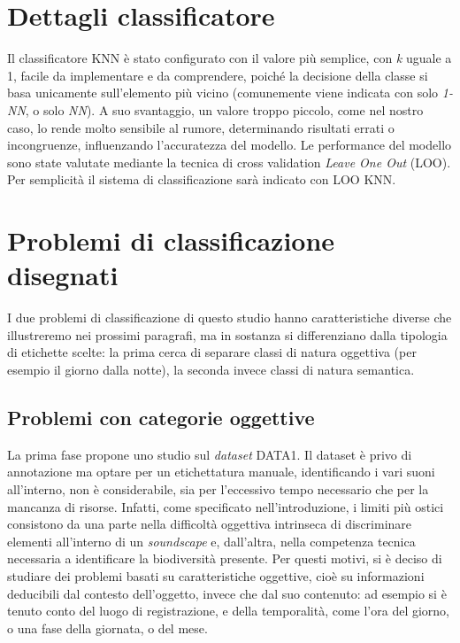\section{Dettagli classificatore}
Il classificatore KNN è stato configurato con il valore più semplice, con \textit{k} uguale a 1, facile da
implementare e da comprendere, poiché la decisione della classe si basa unicamente
sull’elemento più vicino (comunemente viene indicata con solo \textit{1-NN}, o solo \textit{NN}). A suo
svantaggio, un valore troppo piccolo, come nel nostro caso, lo rende molto sensibile al
rumore, determinando risultati errati o incongruenze, influenzando l’accuratezza del modello.
Le performance del modello sono state valutate mediante la tecnica di cross validation \textit{Leave
One Out} (LOO). Per semplicità il sistema di classificazione sarà indicato con LOO KNN.

\section{Problemi di classificazione disegnati}
I due problemi di classificazione di questo studio hanno caratteristiche diverse che
illustreremo nei prossimi paragrafi, ma in sostanza si differenziano dalla tipologia di etichette
scelte: la prima cerca di separare classi di natura oggettiva (per esempio il giorno dalla notte),
la seconda invece classi di natura semantica.

\subsection{Problemi con categorie oggettive}
La prima fase propone uno studio sul \textit{dataset} DATA1. Il dataset è privo di annotazione ma
optare per un etichettatura manuale, identificando i vari suoni all’interno, non è considerabile,
sia per l’eccessivo tempo necessario che per la mancanza di risorse. Infatti, come specificato
nell’introduzione, i limiti più ostici consistono da una parte nella difficoltà oggettiva
intrinseca di discriminare elementi all’interno di un \textit{soundscape} e, dall’altra, nella
competenza tecnica necessaria a identificare la biodiversità presente. Per questi motivi, si è
deciso di studiare dei problemi basati su caratteristiche oggettive, cioè su informazioni
deducibili dal contesto dell’oggetto, invece che dal suo contenuto: ad esempio si è tenuto
conto del luogo di registrazione, e della temporalità, come l’ora del giorno, o una fase della
giornata, o del mese.

